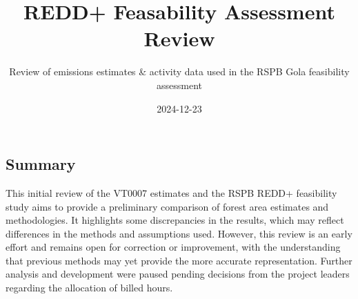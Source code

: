 \documentclass[
]{article}
\title{REDD+ Feasability Assessment Review}
\subtitle{Review of emissions estimates \& activity data used in the
RSPB Gola feasibility assessment}
\author{}
\date{\vspace{-2.5em}2024-12-23}
\begin{document}
\maketitle

\subsection{Summary}\label{summary}

This initial review of the VT0007 estimates and the RSPB REDD+
feasibility study aims to provide a preliminary comparison of forest
area estimates and methodologies. It highlights some discrepancies in
the results, which may reflect differences in the methods and
assumptions used. However, this review is an early effort and remains
open for correction or improvement, with the understanding that previous
methods may yet provide the more accurate representation. Further
analysis and development were paused pending decisions from the project
leaders regarding the allocation of billed hours.
\end{document}
